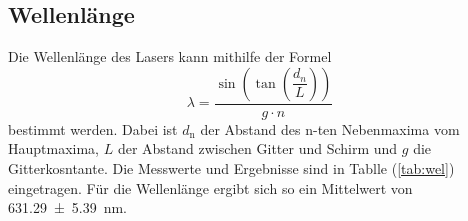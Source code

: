 \subsection{Wellenlänge}
\label{sec:wel}

Die Wellenlänge des Lasers kann mithilfe der Formel
\begin{equation}
  \lambda = \dfrac{\sin\left(\tan\left(\dfrac{d_n}{L}\right)\right)}{g \cdot n}
\end{equation}
bestimmt werden.
Dabei ist $d_\mathrm{n}$ der Abstand des n-ten Nebenmaxima vom Hauptmaxima, $L$ der Abstand zwischen Gitter und Schirm und $g$ die Gitterkosntante.
Die Messwerte und Ergebnisse sind in Tablle (\ref{tab:wel}) eingetragen.
Für die Wellenlänge ergibt sich so ein Mittelwert von \SI{631.29(539)}{\nano\meter}.

